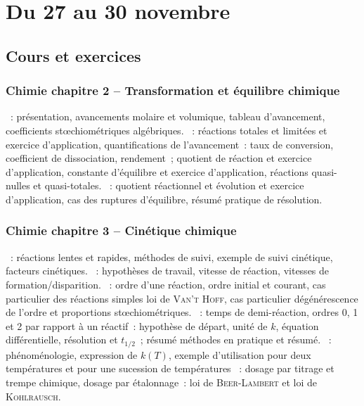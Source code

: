 \documentclass[a4paper, 12pt, final, garamond]{book}
\begin{document}
\setcounter{chapter}{8}

\chapter{Du 27 au 30 novembre}

\section{Cours et exercices}
\subsection{Chimie chapitre 2 -- Transformation et équilibre chimique}
\begin{enumerate}[label=\Roman*]
	~: présentation, avancements molaire
	et volumique, tableau d'avancement, coefficients stœchiométriques
	algébriques.
	~: réactions
	totales et limitées et exercice d'application, quantifications de
	l'avancement~: taux de conversion, coefficient de dissociation,
	rendement~; quotient de réaction et exercice d'application, constante
	d'équilibre et exercice d'application, réactions quasi-nulles et
	quasi-totales.
	~: quotient réactionnel et
	évolution et exercice d'application, cas des ruptures d'équilibre,
	résumé pratique de résolution.
\end{enumerate}

\subsection{Chimie chapitre 3 -- Cinétique chimique}
\begin{enumerate}[label=\Roman*]
	~: réactions lentes et rapides, méthodes de
	suivi, exemple de suivi cinétique, facteurs cinétiques.
	~: hypothèses de travail, vitesse de
	réaction, vitesses de formation/disparition.
	~: ordre d'une réaction,
	ordre initial et courant, cas particulier des réactions simples loi de
	\textsc{Van't Hoff}, cas particulier dégénérescence de l'ordre et
	proportions stœchiométriques.
	~: temps de demi-réaction, ordres 0, 1
	et 2 par rapport à un réactif~: hypothèse de départ, unité de $k$,
	équation différentielle, résolution et $t_{1/2}$~; résumé méthodes en
	pratique et résumé.
	~: phénoménologie, expression
	de $k(T)$, exemple d'utilisation pour deux températures et pour une
	sucession de températures
	~: dosage par
	titrage et trempe chimique, dosage par étalonnage~: loi de
	\textsc{Beer-Lambert} et loi de \textsc{Kohlrausch}.
\end{enumerate}
\end{document}
